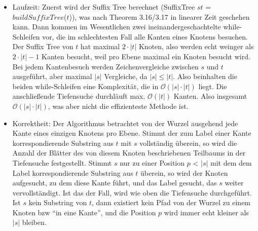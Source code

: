 \documentclass[a4paper,10pt,oneside,leqno]{scrartcl}
\begin{document}
\begin{itemize}
 \item Laufzeit: Zuerst wird der Suffix Tree berechnet (SuffixTree $st$ = $buildSuffixTree$($t$)), was nach Theorem 3.16/3.17 in linearer
 Zeit geschehen kann. Dann kommen im Wesentlichen zwei ineinandergeschachtelte while-Schleifen vor, die im schlechtesten Fall alle
 Kanten eines Knotens besuchen. Der Suffix Tree von $t$ hat maximal $2\cdot |t|$ Knoten, also werden echt weinger als $2\cdot |t|-1$ Kanten besucht,
 weil pro Ebene maximal ein Knoten besucht wird. Bei jedem Kantenbesuch werden Zeichenvergleiche zwischen $s$ und $t$ ausgeführt, aber maximal
 $|s|$ Vergleiche, da $|s| \leq |t|$. Also beinhalten die beiden while-Schleifen eine Komplexität, die in $\mathcal{O}(|s| \cdot |t|)$ liegt.
 Die anschließende Tiefensuche durchläuft max. $\mathcal{O}(|t|)$ Kanten. Also insgesamt $\mathcal{O}(|s| \cdot |t|)$, was aber nicht die effizienteste
 Methode ist. 
 
 \item Korrektheit: Der Algorithmus betrachtet von der Wurzel ausgehend jede Kante eines einzigen Knotens pro Ebene. Stimmt der zum Label einer Kante
 korrespondierende Substring aus $t$ mit $s$ vollständig überein, so wird die Anzahl der Blätter des von diesem Knoten beschriebenen Teilbaums in der
 Tiefensuche festgestellt. Stimmt $s$ nur zu einer Position $p$ < $|s|$ mit dem dem Label korrespondierende Substring aus $t$ überein, so wird der Knoten
 aufgesucht, zu dem diese Kante führt, und das Label gesucht, das $s$ weiter vervollständigt. Ist das der Fall, wird wie oben die Tiefensuche durchgeführt.
 Ist $s$ kein Substring von $t$, dann existiert kein Pfad von der Wurzel zu einem Knoten bzw ``in eine Kante'', und die Position $p$ wird immer echt
 kleiner als $|s|$ bleiben.
\end{itemize}
\end{document}
